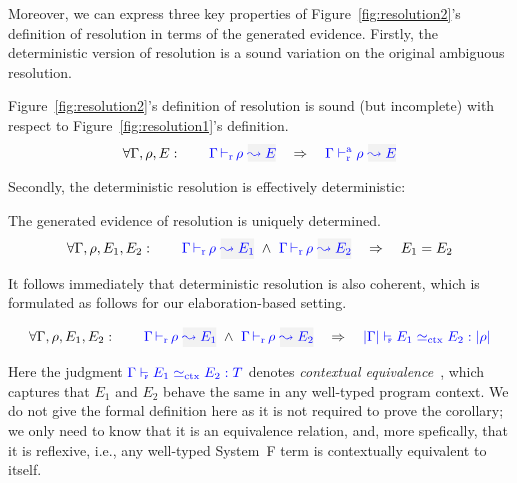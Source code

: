 Moreover, we can express three key properties of Figure~\ref{fig:resolution2}'s
definition of resolution in terms of the generated evidence.
Firstly, the deterministic version of resolution is a sound variation on the original ambiguous resolution.
\begin{theorem}[Soundness]
Figure~\ref{fig:resolution2}'s definition of resolution is sound (but
incomplete) with respect to Figure~\ref{fig:resolution1}'s definition.
\[\forall \tenv, \rulet, E: \quad\quad \dres{\tenv}{\rulet}{E} \quad\Rightarrow\quad \ares{\tenv}{\rulet}{E} \]
\end{theorem}
Secondly, the deterministic resolution is effectively deterministic:
\begin{theorem}[Determinacy]
The generated evidence of resolution is uniquely determined.
\[\forall \tenv, \rulet, E_1, E_2: \quad\quad 
     \dres{\tenv}{\rulet}{E_1} ~\wedge~ 
     \dres{\tenv}{\rulet}{E_2} \quad\Rightarrow\quad E_1 = E_2 \]
\end{theorem}
It follows immediately that deterministic resolution is also coherent,
which is formulated as follows for our elaboration-based setting.
\begin{corollary}[Coherence]
\[\forall \tenv, \rulet, E_1, E_2: \quad\quad 
     \dres{\tenv}{\rulet}{E_1} ~\wedge~ 
     \dres{\tenv}{\rulet}{E_2} \quad\Rightarrow\quad 
     \fctx{\etrans{\tenv}}{E_1}{E_2}{\ttrans[\rulet]} \]
\end{corollary}
Here the judgment ${\color{blue} \Gamma \vdash_{\scriptscriptstyle \hspace{-1mm}\mathtt{F}} E_1 \simeq_{\rm ctx} E_2 : T}$
denotes \emph{contextual equivalence}~\cite{reynolds?}, which captures that
$E_1$ and $E_2$ behave the same in any well-typed program context. We do not give the
formal definition here as it is not required to prove the corollary; we only
need to know that it is an equivalence relation, and, more spefically, that
it is reflexive, i.e., any well-typed System~F term is contextually equivalent
to itself. 

